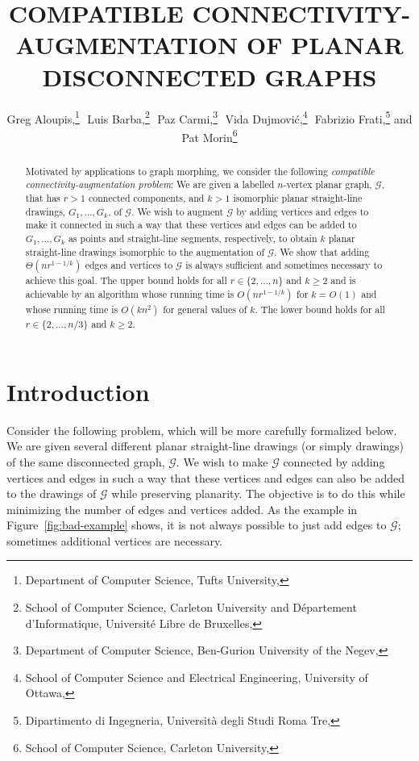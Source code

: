 \documentclass{patmorin}
\title{\MakeUppercase{Compatible Connectivity-Augmentation of Planar Disconnected Graphs}}
\author{Greg Aloupis,\thanks{Department of Computer Science, Tufts University, 
                             \email{aloupis.greg@gmail.com}}\,\,
       Luis Barba,\thanks{School of Computer Science, Carleton University
                          and Département d'Informatique, 
                          Université Libre de Bruxelles,
                          \email{lbarbafl@ulb.ac.be}}\,\,
       Paz Carmi,\thanks{Department of Computer Science,
                         Ben-Gurion University of the Negev,
                         \email{carmip@cs.bgu.ac.il}}\,\,
       Vida Dujmović,\thanks{School of Computer Science 
                             and Electrical Engineering,
                             University of Ottawa,
                             \email{vida.dujmovic@uottawa.ca}}\,\,
       Fabrizio Frati,\thanks{Dipartimento di Ingegneria,
                              Università degli Studi Roma Tre,
                              \email{frati@dia.uniroma3.it}}\newline
       and Pat Morin\thanks{School of Computer Science, Carleton University,
                            \email{morin@scs.carleton.ca}}}
\begin{document}
\begin{titlepage}

\maketitle
\begin{abstract}
\setlength{\baselineskip}{16.8pt}
Motivated by applications to graph morphing, we consider the following
\emph{compatible connectivity-augmentation problem}: We are given
a labelled $n$-vertex planar graph, $\mathcal{G}$, that has $r>1$
connected components, and $k>1$ isomorphic planar straight-line drawings,
$G_1,\ldots,G_k$, of $\mathcal{G}$. We wish to augment $\mathcal G$
by adding  vertices and edges to make it connected in such a way that
these vertices and edges can be added to $G_1,\ldots,G_k$ as points and
straight-line segments, respectively, to obtain $k$ planar straight-line
drawings isomorphic to the augmentation of $\mathcal G$.  We show
that adding $\Theta(nr^{1-1/k})$ edges and vertices to $\mathcal{G}$
is always sufficient and sometimes necessary to achieve this goal.
The upper bound holds for all $r\in\{2,\ldots,n\}$ and $k\ge 2$ and is
achievable by an algorithm whose running time is $O(nr^{1-1/k})$ for
$k=O(1)$ and whose running time is $O(kn^2)$ for general values of $k$.
The lower bound holds for all $r\in\{2,\ldots,n/3\}$ and $k\ge 2$.
\end{abstract}

\end{titlepage}


\section{Introduction}


Consider the following problem, which will be more carefully formalized
below.  We are given several different planar straight-line drawings
(or simply drawings) of the same disconnected graph, $\mathcal G$.
We wish to make $\mathcal G$ connected by adding vertices and edges in
such a way that these vertices and edges can also be added to the 
drawings of $\mathcal G$ while preserving planarity.  
The objective is to do this while minimizing the number
of edges and vertices added.  As the example in Figure~\ref{fig:bad-example} shows, it is not always possible to just add edges to $\mathcal G$; sometimes additional vertices are necessary.
\end{document}
